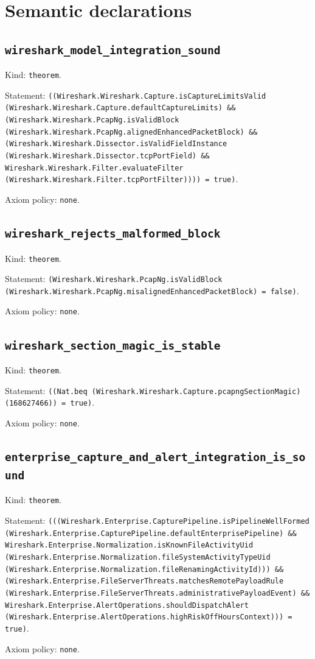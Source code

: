 \documentclass[11pt]{article}
\begin{document}
\section*{Semantic declarations}
\subsection*{\texttt{wireshark\_model\_integration\_sound}}
\noindent Kind: \texttt{theorem}.\par
\noindent Statement: \texttt{((Wireshark.Wireshark.Capture.isCaptureLimitsValid (Wireshark.Wireshark.Capture.defaultCaptureLimits) \&\& (Wireshark.Wireshark.PcapNg.isValidBlock (Wireshark.Wireshark.PcapNg.alignedEnhancedPacketBlock) \&\& (Wireshark.Wireshark.Dissector.isValidFieldInstance (Wireshark.Wireshark.Dissector.tcpPortField) \&\& Wireshark.Wireshark.Filter.evaluateFilter (Wireshark.Wireshark.Filter.tcpPortFilter)))) = true)}.\par
\noindent Axiom policy: \texttt{none}.\par
\subsection*{\texttt{wireshark\_rejects\_malformed\_block}}
\noindent Kind: \texttt{theorem}.\par
\noindent Statement: \texttt{(Wireshark.Wireshark.PcapNg.isValidBlock (Wireshark.Wireshark.PcapNg.misalignedEnhancedPacketBlock) = false)}.\par
\noindent Axiom policy: \texttt{none}.\par
\subsection*{\texttt{wireshark\_section\_magic\_is\_stable}}
\noindent Kind: \texttt{theorem}.\par
\noindent Statement: \texttt{((Nat.beq (Wireshark.Wireshark.Capture.pcapngSectionMagic) (168627466)) = true)}.\par
\noindent Axiom policy: \texttt{none}.\par
\subsection*{\texttt{enterprise\_capture\_and\_alert\_integration\_is\_sound}}
\noindent Kind: \texttt{theorem}.\par
\noindent Statement: \texttt{(((Wireshark.Enterprise.CapturePipeline.isPipelineWellFormed (Wireshark.Enterprise.CapturePipeline.defaultEnterprisePipeline) \&\& Wireshark.Enterprise.Normalization.isKnownFileActivityUid (Wireshark.Enterprise.Normalization.fileSystemActivityTypeUid (Wireshark.Enterprise.Normalization.fileRenamingActivityId))) \&\& (Wireshark.Enterprise.FileServerThreats.matchesRemotePayloadRule (Wireshark.Enterprise.FileServerThreats.administrativePayloadEvent) \&\& Wireshark.Enterprise.AlertOperations.shouldDispatchAlert (Wireshark.Enterprise.AlertOperations.highRiskOffHoursContext))) = true)}.\par
\noindent Axiom policy: \texttt{none}.\par
\end{document}
